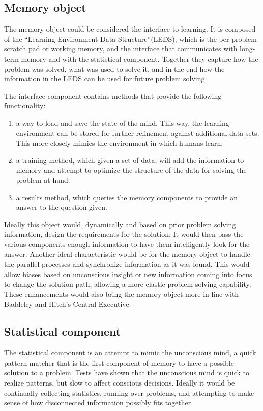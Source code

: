 \subsection{Memory object} 

The memory object could be considered the interface to learning. It is composed of the 
``Learning Environment Data Structure''(LEDS), which is the per-problem scratch pad or working memory, 
and the interface that communicates with long-term memory and with the statistical component. 
Together they capture how the problem was solved, what was used to solve it, and in the end 
how the information in the LEDS can be used for future problem solving.

The interface component contains methods that provide the following functionality:

\begin{enumerate}     
	\item a way to load and save the state of the mind. This way, the learning
	environment can be stored for further refinement against 
	additional data sets. This more closely mimics the environment in which 
	humans learn.
	\item a training method, which given a set of data, will add the
	information to memory and attempt to optimize the structure of the data 
	for solving the problem at hand.
	\item a results method, which queries the memory components to provide an answer
	to the question given.
\end{enumerate}

Ideally this object would, dynamically
and based on prior problem solving information, design the requirements for the
solution. It would then pass the various components enough information to have
them intelligently look for the answer.  Another ideal characteristic would be
for the memory object to handle the parallel processes and synchronize
information as it was found.  This would allow biases based on unconscious
insight or new information coming into focus to change the solution path,
allowing a more elastic problem-solving capability.  These enhancements would
also bring the memory object more in line with Baddeley and Hitch's Central Executive.

\subsection{Statistical component} 

The statistical component is an attempt to
mimic the unconscious mind, a quick pattern matcher that is the first
component of memory to have a possible solution to a problem.  Tests have shown
\cite{BLINK} that the unconscious mind is quick to realize patterns, but slow to
affect conscious decisions. Ideally it would be continually collecting
statistics, running over problems, and attempting to make sense of how
disconnected information possibly fits together.

